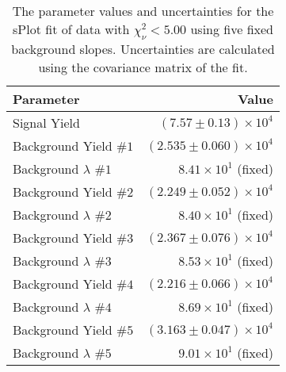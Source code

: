 
\begin{table}[ht]
    \begin{center}
        \begin{tabular}{lr}\toprule
            Parameter & Value \\\midrule
            Signal Yield & $(7.57 \pm 0.13) \times 10^{4}$ \\
            Background Yield $\#1$ & $(2.535 \pm 0.060) \times 10^{4}$ \\
            Background $\lambda$ $\#1$ & $8.41 \times 10^{1}$ (fixed) \\
            Background Yield $\#2$ & $(2.249 \pm 0.052) \times 10^{4}$ \\
            Background $\lambda$ $\#2$ & $8.40 \times 10^{1}$ (fixed) \\
            Background Yield $\#3$ & $(2.367 \pm 0.076) \times 10^{4}$ \\
            Background $\lambda$ $\#3$ & $8.53 \times 10^{1}$ (fixed) \\
            Background Yield $\#4$ & $(2.216 \pm 0.066) \times 10^{4}$ \\
            Background $\lambda$ $\#4$ & $8.69 \times 10^{1}$ (fixed) \\
            Background Yield $\#5$ & $(3.163 \pm 0.047) \times 10^{4}$ \\
            Background $\lambda$ $\#5$ & $9.01 \times 10^{1}$ (fixed) \\\bottomrule
        \end{tabular}
        \caption{The parameter values and uncertainties for the sPlot fit of data with $\chi^2_\nu < 5.00$ using five fixed background slopes. Uncertainties are calculated using the covariance matrix of the fit.}\label{tab:splot-fit-results-chisqdof-5.00-fixed-5}
    \end{center}
\end{table}
